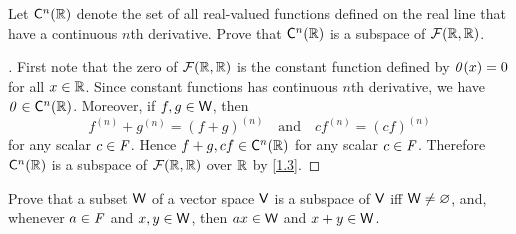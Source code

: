 \setcounter{ex}{15}
\begin{ex}\label{ex:1.3.16}
	Let \(\cfs[n](\R)\) denote the set of all real-valued functions defined on the real line that have a continuous \(n\)th derivative.
	Prove that \(\cfs[n](\R)\) is a subspace of \(\mathcal{F}(\mathbb{R}, \mathbb{R})\).
\end{ex}

\begin{proof}[]
	First note that the zero of \(\mathcal{F}(\mathbb{R}, \mathbb{R})\) is the constant function defined by \(\mathit{0}(x) = 0\) for all \(x \in \mathbb{R}\).
	Since constant functions has continuous \(n\)th derivative, we have \(\zv \in \cfs[n](\R)\).
	Moreover, if \(f, g \in \mathsf{W}\), then
	\[
		f^{(n)} + g^{(n)} = (f + g)^{(n)} \quad \text{and} \quad cf^{(n)} = (cf)^{(n)}
	\]
	for any scalar \(c \in \mathit{F}\).
	Hence \(f + g, cf \in \cfs[n](\R)\) for any scalar \(c \in \mathit{F}\).
	Therefore \(\cfs[n](\R)\) is a subspace of \(\mathcal{F}(\mathbb{R}, \mathbb{R})\) over \(\mathbb{R}\) by \cref{1.3}.
\end{proof}

\begin{ex}\label{ex:1.3.17}
	Prove that a subset \(\mathsf{W}\) of a vector space \(\mathsf{V}\) is a subspace of \(\mathsf{V}\) iff \(\mathsf{W} \neq \varnothing\), and, whenever \(a \in \mathit{F}\) and \(x, y \in \mathsf{W}\), then \(ax \in \mathsf{W}\) and \(x + y \in \mathsf{W}\).
\end{ex}

